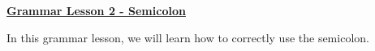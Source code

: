 \documentclass[12pt]{article} %
\begin{document}
	\renewcommand*{\coursecode}{MATH 235} %
	\renewcommand*{\assgnnumber}{Assignment 1} %
	\renewcommand*{\submdate}{September 14, 2021} %
	\renewcommand*{\studentfname}{Abdullah} %
	\renewcommand*{\studentlname}{Zubair} %
    \renewcommand*{\proofname}{Proof:}

	\renewcommand\qedsymbol{$\blacksquare$}
	\setfigpath
	\fancyhfoffset[L,O]{0pt} %




\begin{center}
  \textbf{\underline{\Huge{Grammar Lesson 2 - Semicolon}}}
\end{center}

In this grammar lesson, we will learn how to correctly use the semicolon.
\end{document}
